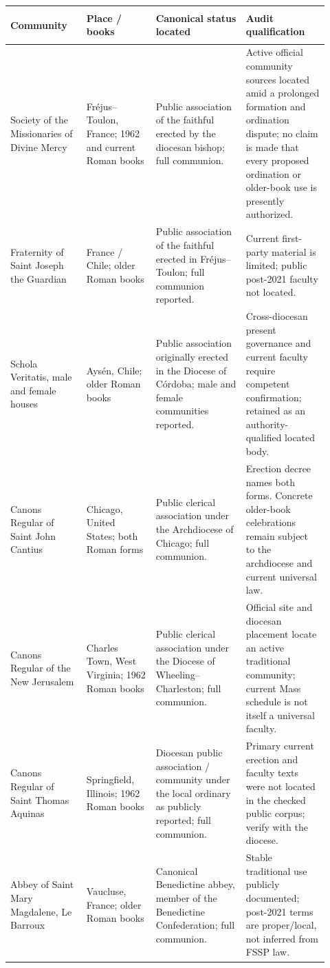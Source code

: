 \begin{longtable}{>{\bfseries\raggedright\arraybackslash}p{0.22\linewidth}>{\raggedright\arraybackslash}p{0.20\linewidth}>{\raggedright\arraybackslash}p{0.26\linewidth}>{\raggedright\arraybackslash}p{0.24\linewidth}}
\toprule
\textbf{Community} & \textbf{Place / books} & \textbf{Canonical status located} & \textbf{Audit qualification}\\
\midrule
\endhead
Society of the Missionaries of Divine Mercy & Fréjus--Toulon, France; 1962 and current Roman books & Public association of the faithful erected by the diocesan bishop; full communion. & Active official community sources located amid a prolonged formation and ordination dispute; no claim is made that every proposed ordination or older-book use is presently authorized.\\
Fraternity of Saint Joseph the Guardian & France / Chile; older Roman books & Public association of the faithful erected in Fréjus--Toulon; full communion reported. & Current first-party material is limited; public post-2021 faculty not located.\\
Schola Veritatis, male and female houses & Aysén, Chile; older Roman books & Public association originally erected in the Diocese of Córdoba; male and female communities reported. & Cross-diocesan present governance and current faculty require competent confirmation; retained as an authority-qualified located body.\\
Canons Regular of Saint John Cantius & Chicago, United States; both Roman forms & Public clerical association under the Archdiocese of Chicago; full communion. & Erection decree names both forms. Concrete older-book celebrations remain subject to the archdiocese and current universal law.\\
Canons Regular of the New Jerusalem & Charles Town, West Virginia; 1962 Roman books & Public clerical association under the Diocese of Wheeling--Charleston; full communion. & Official site and diocesan placement locate an active traditional community; current Mass schedule is not itself a universal faculty.\\
Canons Regular of Saint Thomas Aquinas & Springfield, Illinois; 1962 Roman books & Diocesan public association / community under the local ordinary as publicly reported; full communion. & Primary current erection and faculty texts were not located in the checked public corpus; verify with the diocese.\\
Abbey of Saint Mary Magdalene, Le Barroux & Vaucluse, France; older Roman books & Canonical Benedictine abbey, member of the Benedictine Confederation; full communion. & Stable traditional use publicly documented; post-2021 terms are proper/local, not inferred from FSSP law.\\

\end{longtable}
